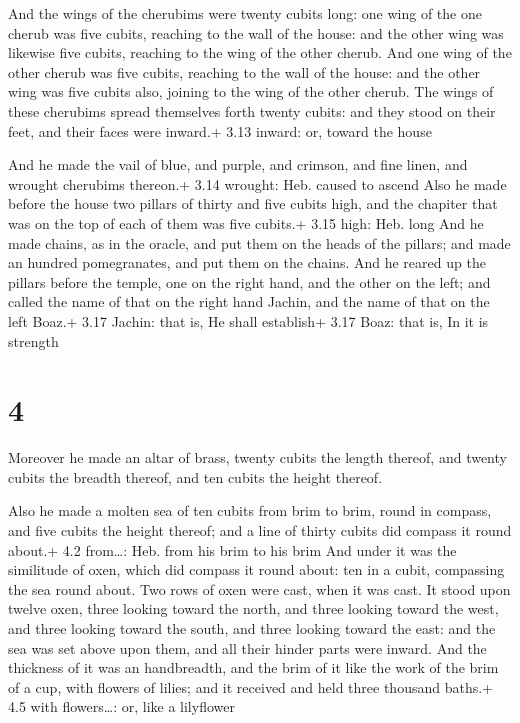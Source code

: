 And the wings of the cherubims were twenty cubits long:
one wing of the one cherub was five cubits, reaching to the wall of the
house: and the other wing was likewise five cubits, reaching to the wing
of the other cherub.  And one wing of the other cherub was
five cubits, reaching to the wall of the house: and the other wing was
five cubits also, joining to the wing of the other cherub. 
The wings of these cherubims spread themselves forth twenty cubits: and
they stood on their feet, and their faces were inward.+ 3.13 inward: or,
toward the house

 And he made the vail of blue, and purple, and crimson,
and fine linen, and wrought cherubims thereon.+ 3.14 wrought: Heb.
caused to ascend  Also he made before the house two pillars
of thirty and five cubits high, and the chapiter that was on the top of
each of them was five cubits.+ 3.15 high: Heb. long  And he
made chains, as in the oracle, and put them on the heads of the pillars;
and made an hundred pomegranates, and put them on the chains.
 And he reared up the pillars before the temple, one on the
right hand, and the other on the left; and called the name of that on
the right hand Jachin, and the name of that on the left Boaz.+ 3.17
Jachin: that is, He shall establish+ 3.17 Boaz: that is, In it is
strength

\hypertarget{section-3}{%
\section{4}\label{section-3}}

 Moreover he made an altar of brass, twenty cubits the
length thereof, and twenty cubits the breadth thereof, and ten cubits
the height thereof.

 Also he made a molten sea of ten cubits from brim to
brim, round in compass, and five cubits the height thereof; and a line
of thirty cubits did compass it round about.+ 4.2 from\ldots: Heb. from
his brim to his brim  And under it was the similitude of
oxen, which did compass it round about: ten in a cubit, compassing the
sea round about. Two rows of oxen were cast, when it was cast.
 It stood upon twelve oxen, three looking toward the north,
and three looking toward the west, and three looking toward the south,
and three looking toward the east: and the sea was set above upon them,
and all their hinder parts were inward.  And the thickness
of it was an handbreadth, and the brim of it like the work of the brim
of a cup, with flowers of lilies; and it received and held three
thousand baths.+ 4.5 with flowers\ldots: or, like a lilyflower

